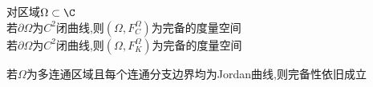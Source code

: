 \begin{dingli}
对区域$\Omega\subset\C$\\
若$\partial\Omega$为$C^2$闭曲线,则$(\Omega,F_{C}^{\Omega})$为完备的度量空间\\
若$\partial\Omega$为$C^2$闭曲线,则$(\Omega,F_{K}^{\Omega})$为完备的度量空间
\end{dingli}

\begin{zhu}
若$\Omega$为多连通区域且每个连通分支边界均为Jordan曲线,则完备性依旧成立
\end{zhu}

\endinput

%